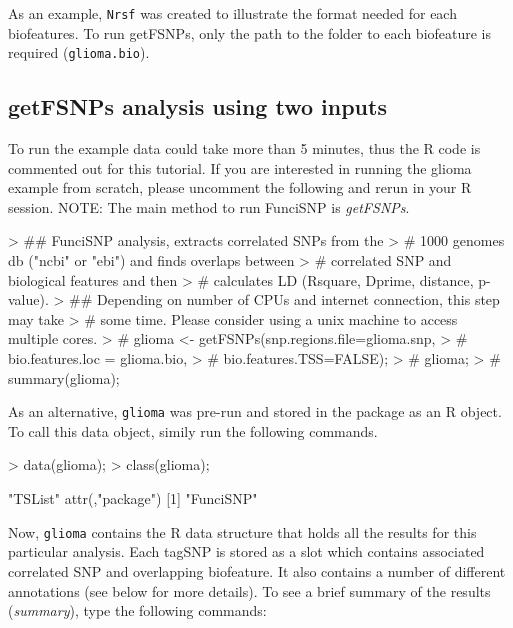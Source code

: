 \documentclass[12pt,fullpage]{article}
\newcommand{\Robject}[1]{{\texttt{#1}}}
\newcommand{\Rmethod}[1]{{\textit{#1}}}
\begin{document}
As an example, \Robject{Nrsf} was created to illustrate the format needed for
each biofeatures. To run getFSNPs, only the path to the folder to each
biofeature is required (\Robject{glioma.bio}).

\subsection{getFSNPs analysis using two inputs}

To run the example data could take more than 5 minutes, thus the R code is
commented out for this tutorial. If you are interested in running the glioma
example from scratch, please uncomment the following and rerun in your R
session. NOTE: The main method to run FunciSNP is \Rmethod{getFSNPs}.

\begin{Schunk}
\begin{Sinput}
> ## FunciSNP analysis, extracts correlated SNPs from the 
> #  1000 genomes db ("ncbi" or "ebi") and finds overlaps between 
> #  correlated SNP and biological features and then 
> #  calculates LD (Rsquare, Dprime, distance, p-value).
> ## Depending on number of CPUs and internet connection, this step may take 
> # some time. Please consider using a unix machine to access multiple cores.
> # glioma <- getFSNPs(snp.regions.file=glioma.snp, 
> #           bio.features.loc = glioma.bio, 
> #           bio.features.TSS=FALSE);
> # glioma;
> # summary(glioma);
\end{Sinput}
\end{Schunk}

As an alternative, \Robject{glioma} was pre-run and stored in the package as an
R object. To call this data object, simily run the following commands. 

\begin{Schunk}
\begin{Sinput}
> data(glioma);
> class(glioma);
\end{Sinput}
\begin{Soutput}
[1] "TSList"
attr(,"package")
[1] "FunciSNP"
\end{Soutput}
\end{Schunk}

Now, \Robject{glioma} contains the R data structure that holds all the results
for this particular analysis. Each tagSNP is stored as a slot which contains
associated correlated SNP and overlapping biofeature. It also contains a number
of different annotations (see below for more details). To see a brief summary of
the results (\Rmethod{summary}), type the following commands:
\end{document}
